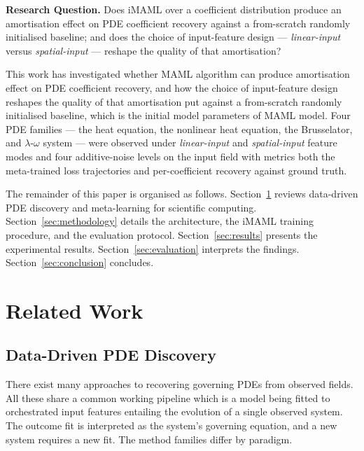 \documentclass[10pt,journal,compsoc]{IEEEtran}
\begin{document}
\textbf{Research Question.} Does iMAML over a coefficient distribution
produce an amortisation effect on PDE coefficient recovery against a
from-scratch randomly initialised baseline; and does the choice of
input-feature design --- \emph{linear-input} versus \emph{spatial-input}
--- reshape the quality of that amortisation?

This work has investigated whether MAML algorithm can produce amortisation
effect on PDE coefficient recovery, and how the choice of input-feature design
reshapes the quality of that amortisation put against a from-scratch randomly
initialised baseline, which is the initial model parameters of MAML model.
Four PDE families --- the heat equation, the nonlinear heat equation, the
Brusselator, and $\lambda$-$\omega$ system --- were observed under
\emph{linear-input} and \emph{spatial-input} feature modes and four
additive-noise levels on the input field with metrics both the meta-trained
loss trajectories and per-coefficient recovery against ground truth.

The remainder of this paper is organised as follows.
Section~\ref{sec:related} reviews data-driven PDE discovery and meta-learning
for scientific computing. Section~\ref{sec:methodology} details the
architecture, the iMAML training procedure, and the evaluation protocol.
Section~\ref{sec:results} presents the experimental results.
Section~\ref{sec:evaluation} interprets the findings.
Section~\ref{sec:conclusion} concludes.

\section{Related Work}\label{sec:related}
\subsection{Data-Driven PDE Discovery}\label{subsec:pde_discovery}

There exist many approaches to recovering governing PDEs from observed fields.
All these share a common working pipeline which is a model being fitted to
orchestrated input features entailing the evolution of a single observed
system. The outcome fit is interpreted as the system's governing equation, and
a new system requires a new fit. The method families differ by paradigm.
\end{document}
